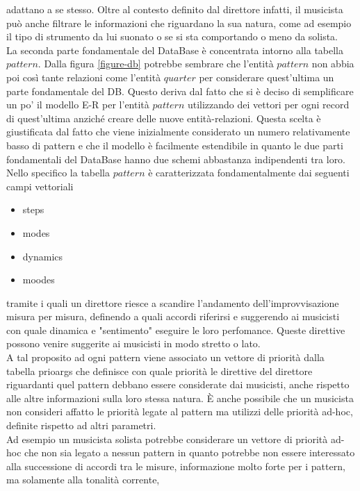 adattano a se stesso. Oltre al contesto definito dal direttore infatti, il musicista
può anche filtrare le informazioni che riguardano la sua natura, come ad esempio 
il tipo di strumento da lui suonato o se si sta comportando o meno da solista.\\
La seconda parte fondamentale del DataBase è concentrata intorno alla tabella $pattern$.
Dalla figura \ref{figure-db} potrebbe sembrare che l'entità $pattern$ non abbia poi 
così tante relazioni come l'entità $quarter$ per considerare quest'ultima un parte
fondamentale del DB. Questo deriva dal fatto che si è deciso di semplificare un po'
il modello E-R per l'entità $pattern$ utilizzando dei vettori per ogni record di 
quest'ultima anziché creare delle nuove entità-relazioni. Questa scelta è giustificata
dal fatto che viene inizialmente considerato un numero relativamente basso di pattern
e che il modello è facilmente estendibile in quanto le due parti fondamentali del 
DataBase hanno due schemi abbastanza indipendenti tra loro.\\
Nello specifico la tabella $pattern$ è caratterizzata fondamentalmente dai 
seguenti campi vettoriali
\begin{itemize}
\item steps 
\item modes 
\item dynamics
\item moodes
\end{itemize}
tramite i quali un direttore riesce a scandire l'andamento dell'improvvisazione 
misura per misura, definendo a quali accordi riferirsi e suggerendo ai musicisti 
con quale dinamica e "sentimento" eseguire le loro perfomance. Queste direttive
possono venire suggerite ai musicisti in modo stretto o lato.\\
A tal proposito ad ogni pattern viene associato un vettore di priorità dalla tabella 
prioargs che definisce con quale priorità le direttive del direttore riguardanti quel 
pattern debbano essere considerate dai musicisti, anche rispetto alle altre 
informazioni sulla loro stessa natura. È anche possibile che un musicista non consideri
affatto le priorità legate al pattern ma utilizzi delle priorità ad-hoc, definite 
rispetto ad altri parametri.\\
Ad esempio un musicista solista potrebbe considerare un vettore di priorità 
ad-hoc che non sia legato a nessun pattern in quanto 
potrebbe non essere interessato alla successione di accordi tra le misure, 
informazione molto forte per i pattern, ma solamente alla tonalità corrente, 
